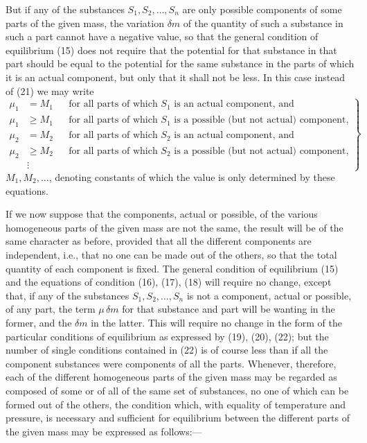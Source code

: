 \documentclass[11pt]{article}
\begin{document}
But if any of the substances \(S_1,S_2,\ldots,S_n\) are only possible components of some parts of the given mass, the variation \(\delta m\) of the quantity of such a substance in such a part cannot have a negative value, so that the general condition of equilibrium (15) does not require that the potential for that substance in that part should be equal to the potential for the same substance in the parts of which it is an actual component, but only that it shall not be less. In this case instead of (21) we may write
\begin{equation}
\left.
\begin{aligned}
\mu_1&=M_1 &&\text{for all parts of which \(S_1\) is an actual component, and}\\
\mu_1&\geq M_1 &&\text{for all parts of which \(S_1\) is a possible (but not actual) component,}\\[0.25em]
\mu_2&=M_2 &&\text{for all parts of which \(S_2\) is an actual component, and}\\
\mu_2&\geq M_2 &&\text{for all parts of which \(S_2\) is a possible (but not actual) component,}\\
&\vdots
\end{aligned}
\right\}
\end{equation}
\(M_1,M_2,\ldots\), denoting constants of which the value is only determined by these equations.

If we now suppose that the components, actual or possible, of the various homogeneous parts of the given mass are not the same, the result will be of the same character as before, provided that all the different components are independent, i.e., that no one can be made out of the others, so that the total quantity of each component is fixed. The general condition of equilibrium (15) and the equations of condition (16), (17), (18) will require no change, except that, if any of the substances \(S_1,S_2,\ldots,S_n\) is not a component, actual or possible, of any part, the term \(\mu\,\delta m\) for that substance and part will be wanting in the former, and the \(\delta m\) in the latter. This will require no change in the form of the particular conditions of equilibrium as expressed by (19), (20), (22); but the number of single conditions contained in (22) is of course less than if all the component substances were components of all the parts. Whenever, therefore, each of the different homogeneous parts of the given mass may be regarded as composed of some or of all of the same set of substances, no one of which can be formed out of the others, the condition which, with equality of temperature and pressure, is necessary and sufficient for equilibrium between the different parts of the given mass may be expressed as follows:—
\end{document}
